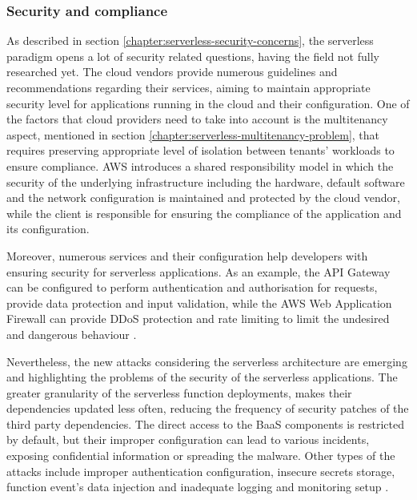 

\subsubsection{Security and compliance} \label{chapter:serverless-suitability-security-and-compliance}

As described in section \ref{chapter:serverless-security-concerns}, the serverless paradigm opens a lot of security related questions, having the field not fully researched yet. The cloud vendors provide numerous guidelines and recommendations regarding their services, aiming to maintain appropriate security level for applications running in the cloud and their configuration.
One of the factors that cloud providers need to take into account is the multitenancy aspect, mentioned in section \ref{chapter:serverless-multitenancy-problem}, that requires preserving appropriate level of isolation between tenants' workloads to ensure compliance.
AWS introduces a shared responsibility model in which the security of the underlying infrastructure including the hardware, default software and the network configuration is maintained and protected by the cloud vendor, while the client is responsible for ensuring the compliance of the application and its configuration.

Moreover, numerous services and their configuration help developers with ensuring security for serverless applications. As an example, the API Gateway can be configured to perform authentication and authorisation for requests, provide data protection and input validation, while the AWS Web Application Firewall can provide DDoS protection and rate limiting to limit the undesired and dangerous behaviour \cite{EvaluationOfServerlessApplicationProgrammingModel}.

Nevertheless, the new attacks considering the serverless architecture are emerging and highlighting the problems of the security of the serverless applications. The greater granularity of the serverless function deployments, makes their dependencies updated less often, reducing the frequency of security patches of the third party dependencies.
The direct access to the BaaS components is restricted by default, but their improper configuration can lead to various incidents, exposing confidential information or spreading the malware.
Other types of the attacks include improper authentication configuration, insecure secrets storage, function event’s data injection and inadequate logging and monitoring setup \cite{EvaluationOfServerlessApplicationProgrammingModel}.

